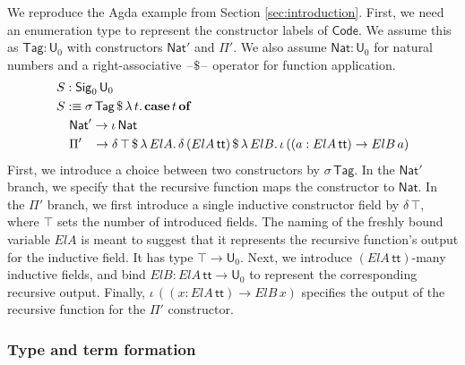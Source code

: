 \documentclass[acmsmall,screen,review]{acmart}
\newcommand{\msf}[1]{{\mathsf{#1}}}
\newcommand{\mbf}[1]{{\mathbf{#1}}}
\newcommand{\U}{\msf{U}}
\newcommand{\Nat}{\msf{Nat}}
\newcommand{\Sig}{\msf{Sig}}
\newcommand{\Code}{\msf{Code}}
\newcommand{\Tag}{\msf{Tag}}
\newcommand{\case}{\mbf{case}}
\newcommand{\of}{\mbf{of}}
\newcommand{\ttt}{\msf{tt}}
\newcommand{\blank}{{\mathord{\hspace{1pt}\text{--}\hspace{1pt}}}}
\begin{document}
\begin{example}\label{ex:code-signature}
We reproduce the Agda example from Section \ref{sec:introduction}. First, we need an enumeration
type to represent the constructor labels of $\Code$. We assume this as $\Tag : \U_0$ with
constructors $\Nat'$ and $\Pi'$. We also assume $\Nat : \U_0$ for natural numbers and a
right-associative $\blank\!\$\!\blank$ operator for function application.
\begin{alignat*}{4}
  & S : \Sig_0\,\U_0\\
  & S :\equiv \sigma\,\Tag\,\$\,\lambda\,t.\,\case\,t\,\of \\
  & \quad \Nat' \to \iota\,\Nat \\
  & \quad \Pi'\hspace{0.85em} \to \delta\,\top\,\$\,\lambda\,{ElA}.\, \delta\,({ElA}\,\ttt)\,\$\,\lambda\,{ElB}.\,
      \iota\, ((a : {ElA}\,\ttt) \to {ElB}\,a)
\end{alignat*}
First, we introduce a choice between two constructors by $\sigma\,\Tag$. In the $\Nat'$ branch, we
specify that the recursive function maps the constructor to $\Nat$. In the $\Pi'$ branch, we first
introduce a single inductive constructor field by $\delta\,\top$, where $\top$ sets the number of
introduced fields. The naming of the freshly bound variable ${ElA}$ is meant to suggest that it
represents the recursive function's output for the inductive field. It has type $\top \to \U_0$.
Next, we introduce $({ElA}\,\ttt)$-many inductive fields, and bind ${ElB} : {ElA}\,\ttt \to \U_0$ to
represent the corresponding recursive output. Finally, $\iota\, ((x : {ElA}\,\ttt) \to {ElB}\,x)$
specifies the output of the recursive function for the $\Pi'$ constructor.
\end{example}

\subsubsection{Type and term formation}\label{sec:ir-type-and-term-formation}
\end{document}
